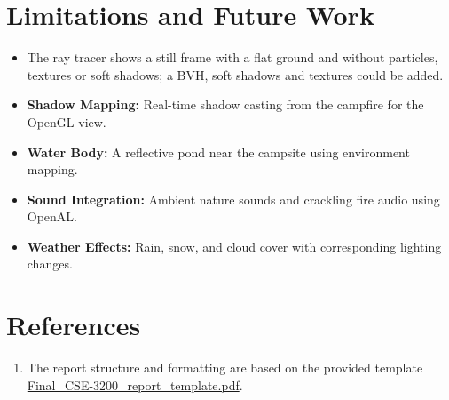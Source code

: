\documentclass[12pt,a4paper]{report}
\begin{document}
\section{Limitations and Future Work}

\begin{itemize}[leftmargin=0.45in]
  \item The ray tracer shows a still frame with a flat ground and without particles, textures or soft shadows; a BVH, soft shadows and textures could be added.
  \item \textbf{Shadow Mapping:} Real-time shadow casting from the campfire for the OpenGL view.
  \item \textbf{Water Body:} A reflective pond near the campsite using environment mapping.
  \item \textbf{Sound Integration:} Ambient nature sounds and crackling fire audio using OpenAL.
  \item \textbf{Weather Effects:} Rain, snow, and cloud cover with corresponding lighting changes.
\end{itemize}

\section*{References}

\begin{enumerate}[leftmargin=0.45in]
  \item The report structure and formatting are based on the provided template \url{Final_CSE-3200_report_template.pdf}.
\end{enumerate}
\end{document}
